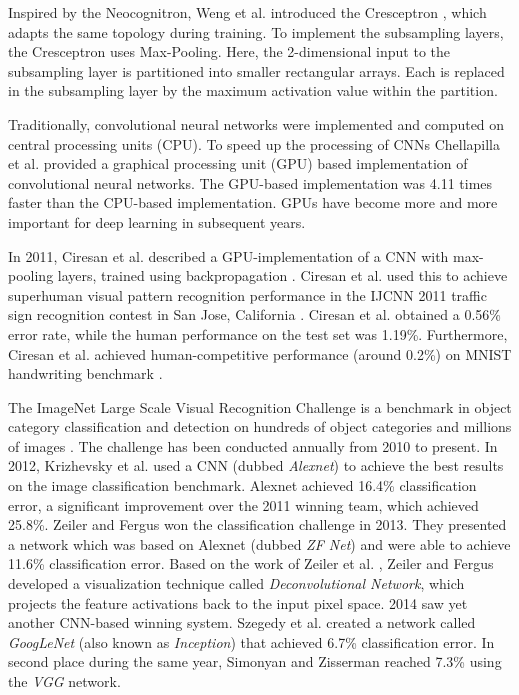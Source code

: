 Inspired by the Neocognitron, Weng et al. introduced the Cresceptron \cite{weng1992cresceptron}, which adapts the same topology during training. To implement the subsampling layers, the Cresceptron uses Max-Pooling. Here, the 2-dimensional input to the subsampling layer is partitioned into smaller rectangular arrays. Each is replaced in the subsampling layer by the maximum activation value within the partition.

Traditionally, convolutional neural networks were implemented and computed on central processing units (CPU). To speed up the processing of CNNs Chellapilla et al. provided a graphical processing unit (GPU) based implementation of convolutional neural networks\cite{chellapilla2006high}. The GPU-based implementation was 4.11 times faster than the CPU-based implementation. GPUs have become more and more important for deep learning in subsequent years.

In 2011, Ciresan et al. \cite{ciresan2011flexible} described a GPU-implementation \cite{chellapilla2006high} of a CNN with max-pooling layers\cite{weng1992cresceptron}, trained using backpropagation \cite{lecun1989backpropagation}. Ciresan et al. used this to achieve superhuman visual pattern recognition performance in the IJCNN 2011 traffic sign recognition contest in San Jose, California \cite{stallkamp2011german} \cite{cirecsan2011committee} \cite{cirecsan2012multitraffic}. Ciresan et al. obtained a 0.56\% error rate, while the human performance on the test set was 1.19\%. Furthermore, Ciresan et al. achieved human-competitive performance (around 0.2\%) on MNIST handwriting benchmark \cite{cirecsan2012multimnist}.

The ImageNet Large Scale Visual Recognition Challenge is a benchmark in object category classification and detection on hundreds of object categories and millions of images \cite{ILSVRC15}. The challenge has been conducted annually from 2010 to present. In 2012, Krizhevsky et al. \cite{krizhevsky2012imagenet} used a CNN (dubbed \textit{Alexnet}) to achieve the best results on the image classification benchmark. Alexnet achieved 16.4\% classification error, a significant improvement over the 2011 winning team, which achieved 25.8\%. Zeiler and Fergus \cite{zeiler2014visualizing} won the classification challenge in 2013. They presented a network which was based on Alexnet (dubbed \textit{ZF Net}) and were able to achieve 11.6\% classification error. Based on the work of Zeiler et al. \cite{zeiler2011adaptive}, Zeiler and Fergus developed a visualization technique called \textit{Deconvolutional Network}, which projects the feature activations back to the input pixel space. 2014 saw yet another CNN-based winning system. Szegedy et al. \cite{szegedy2015going} created a network called \textit{GoogLeNet} (also known as \textit{Inception}) that achieved 6.7\% classification error. In second place during the same year, Simonyan and Zisserman \cite{simonyan2014very} reached 7.3\% using the \textit{VGG} network.


